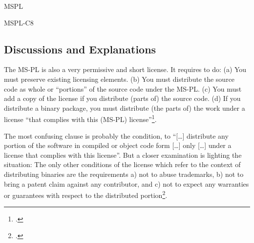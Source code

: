 \begin{license}{MSPL}
\begin{lsuc}{MSPL-C8}

  \begin{lsucrequires}
  
  
  \end{lsucrequires}

  \begin{lsucprohibits}
    \lsucitem{\noLogoOrTrademark} 
  \end{lsucprohibits}
\end{lsuc}

\subsection{Discussions and Explanations}
\label{MSPLDiscussion}

The MS-PL is also a very permissive and short license. It requires to do:
(a) You must preserve existing licensing elements. (b) You must distribute
the source code as whole or \enquote{portions} of the source code under the
MS-PL. (c) You must add a copy of the license if you distribute (parts of) the
source code. (d) If you distribute a binary package, you must distribute (the
parts of) the work under a license \enquote{that complies with this (MS-PL)
license}\footcite[cf.][\nopage wp]{MsplOsiLicense2013a}.

The most confusing clause is probably the condition, to \enquote{[\ldots]
distribute any portion of the software in compiled or object code form [\ldots]
only [\ldots] under a license that complies with this license}. But a closer
examination is lighting the situation: The only other conditions of the license
which refer to the context of distributing binaries are the requirements a) not
to abuse trademarks, b) not to bring a patent claim against any contributor, and
c) not to expect any warranties or guarantees with respect to the distributed
portion\footcite[cf.][\nopage wp.\ §3A, §3B, §3E]{MsplOsiLicense2013a}.


\end{license}
